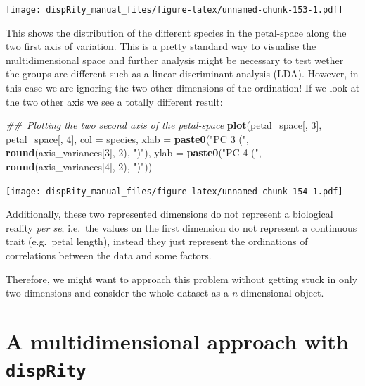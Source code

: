 \documentclass[]{book}
\newenvironment{Shaded}{\begin{snugshade}}{\end{snugshade}}
\newcommand{\CommentTok}[1]{\textcolor[rgb]{0.56,0.35,0.01}{\textit{#1}}}
\newcommand{\DataTypeTok}[1]{\textcolor[rgb]{0.13,0.29,0.53}{#1}}
\newcommand{\DecValTok}[1]{\textcolor[rgb]{0.00,0.00,0.81}{#1}}
\newcommand{\KeywordTok}[1]{\textcolor[rgb]{0.13,0.29,0.53}{\textbf{#1}}}
\newcommand{\NormalTok}[1]{#1}
\newcommand{\StringTok}[1]{\textcolor[rgb]{0.31,0.60,0.02}{#1}}
\begin{document}
\texttt{[image: dispRity\_manual\_files/figure-latex/unnamed-chunk-153-1.pdf]}

This shows the distribution of the different species in the petal-space along the two first axis of variation.
This is a pretty standard way to visualise the multidimensional space and further analysis might be necessary to test wether the groups are different such as a linear discriminant analysis (LDA).
However, in this case we are ignoring the two other dimensions of the ordination!
If we look at the two other axis we see a totally different result:

\begin{Shaded}
\begin{Highlighting}[]
\CommentTok{## Plotting the two second axis of the petal-space}
\KeywordTok{plot}\NormalTok{(petal_space[, }\DecValTok{3}\NormalTok{], petal_space[, }\DecValTok{4}\NormalTok{], }\DataTypeTok{col =}\NormalTok{ species,}
    \DataTypeTok{xlab =} \KeywordTok{paste0}\NormalTok{(}\StringTok{"PC 3 ("}\NormalTok{, }\KeywordTok{round}\NormalTok{(axis_variances[}\DecValTok{3}\NormalTok{], }\DecValTok{2}\NormalTok{), }\StringTok{")"}\NormalTok{),}
    \DataTypeTok{ylab =} \KeywordTok{paste0}\NormalTok{(}\StringTok{"PC 4 ("}\NormalTok{, }\KeywordTok{round}\NormalTok{(axis_variances[}\DecValTok{4}\NormalTok{], }\DecValTok{2}\NormalTok{), }\StringTok{")"}\NormalTok{))}
\end{Highlighting}
\end{Shaded}

\texttt{[image: dispRity\_manual\_files/figure-latex/unnamed-chunk-154-1.pdf]}

Additionally, these two represented dimensions do not represent a biological reality \emph{per se}; i.e.~the values on the first dimension do not represent a continuous trait (e.g.~petal length), instead they just represent the ordinations of correlations between the data and some factors.

Therefore, we might want to approach this problem without getting stuck in only two dimensions and consider the whole dataset as a \emph{n}-dimensional object.

\hypertarget{a-multidimensional-approach-with-disprity}{%
\section{\texorpdfstring{A multidimensional approach with \texttt{dispRity}}{A multidimensional approach with dispRity}}\label{a-multidimensional-approach-with-disprity}}
\end{document}
